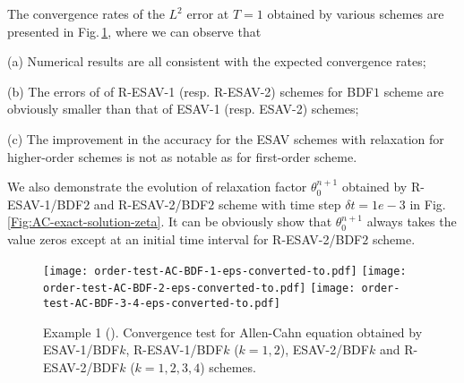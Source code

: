 \documentclass[final,review,onefignum,onetabnum]{siamart190516}
\theoremstyle{plain}
\begin{document}
The convergence rates of the $L^2$ error at $T = 1$ obtained by various schemes are presented in Fig.\,\ref{Fig:AC-order-test}, where we can observe that 

(a) Numerical results are all consistent with the expected convergence rates; 

(b) The errors of of  R-ESAV-1 (resp. R-ESAV-2) schemes for BDF$1$ scheme are  obviously smaller than that of ESAV-1 (resp. ESAV-2) schemes; 

(c) The improvement in the accuracy for the ESAV schemes with relaxation for higher-order schemes is not as notable as for first-order scheme. 

We also demonstrate  the evolution of relaxation factor $\theta_0^{n+1}$ obtained by  R-ESAV-1/BDF$2$ and R-ESAV-2/BDF$2$ scheme with time step $\delta t=1e-3$ in Fig.\,\ref{Fig:AC-exact-solution-zeta}. It can be obviously show that $\theta_0^{n+1}$ always takes the value zeros except at an initial time interval for R-ESAV-2/BDF$2$ scheme.



\begin{figure}[htbp]
	\centering
	\texttt{[image: order-test-AC-BDF-1-eps-converted-to.pdf]}\hspace{-6mm}
	\texttt{[image: order-test-AC-BDF-2-eps-converted-to.pdf]}\hspace{-6mm}
	\texttt{[image: order-test-AC-BDF-3-4-eps-converted-to.pdf]}
\caption{Example 1 (). Convergence test for Allen-Cahn equation obtained by ESAV-1/BDF$k$, R-ESAV-1/BDF$k$ ($k=1, 2$), ESAV-2/BDF$k$ and R-ESAV-2/BDF$k$ ($k=1, 2, 3, 4$) schemes.}
	\label{Fig:AC-order-test}
\end{figure} 
\end{document}
